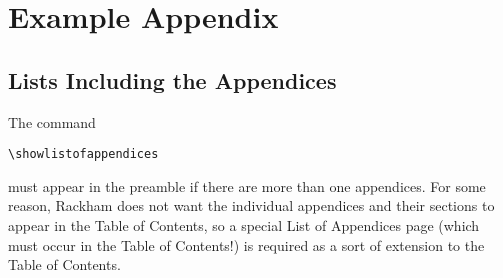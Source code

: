 \documentclass[thesis]{thesis-umich}
\begin{document}
\appendix
\chapter{Example Appendix}

\section{Lists Including the Appendices}
The command
\begin{verbatim}
\showlistofappendices
\end{verbatim}
must appear in the preamble if there are more than one appendices.  For
some reason, Rackham does not want the individual appendices and their
sections to appear in the Table of Contents, so a special List of
Appendices page (which must occur in the Table of Contents!) is required
as a sort of extension to the Table of Contents.

\nocite{*}




\end{document}
